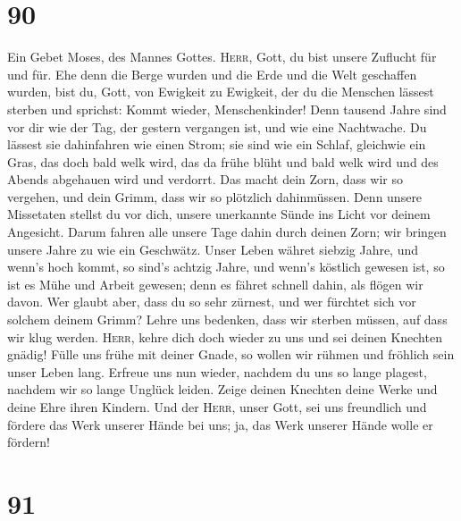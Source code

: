 \hypertarget{section-89}{%
\section{90}\label{section-89}}

 Ein Gebet Moses, des Mannes Gottes. \textsc{Herr}, Gott,
du bist unsere Zuflucht für und für.  Ehe denn die Berge
wurden und die Erde und die Welt geschaffen wurden, bist du, Gott, von
Ewigkeit zu Ewigkeit,  der du die Menschen lässest sterben
und sprichst: Kommt wieder, Menschenkinder!  Denn tausend
Jahre sind vor dir wie der Tag, der gestern vergangen ist, und wie eine
Nachtwache.  Du lässest sie dahinfahren wie einen Strom;
sie sind wie ein Schlaf, gleichwie ein Gras, das doch bald welk wird,
 das da frühe blüht und bald welk wird und des Abends
abgehauen wird und verdorrt.  Das macht dein Zorn, dass
wir so vergehen, und dein Grimm, dass wir so plötzlich dahinmüssen.
 Denn unsere Missetaten stellst du vor dich, unsere
unerkannte Sünde ins Licht vor deinem Angesicht.  Darum
fahren alle unsere Tage dahin durch deinen Zorn; wir bringen unsere
Jahre zu wie ein Geschwätz.  Unser Leben währet siebzig
Jahre, und wenn's hoch kommt, so sind's achtzig Jahre, und wenn's
köstlich gewesen ist, so ist es Mühe und Arbeit gewesen; denn es fähret
schnell dahin, als flögen wir davon.  Wer glaubt aber,
dass du so sehr zürnest, und wer fürchtet sich vor solchem deinem Grimm?
 Lehre uns bedenken, dass wir sterben müssen, auf dass
wir klug werden.  \textsc{Herr}, kehre dich doch wieder
zu uns und sei deinen Knechten gnädig!  Fülle uns frühe
mit deiner Gnade, so wollen wir rühmen und fröhlich sein unser Leben
lang.  Erfreue uns nun wieder, nachdem du uns so lange
plagest, nachdem wir so lange Unglück leiden.  Zeige
deinen Knechten deine Werke und deine Ehre ihren Kindern.
 Und der \textsc{Herr}, unser Gott, sei uns freundlich
und fördere das Werk unserer Hände bei uns; ja, das Werk unserer Hände
wolle er fördern!

\hypertarget{section-90}{%
\section{91}\label{section-90}}


